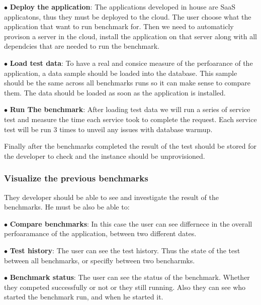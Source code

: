 $\bullet$ \textbf{Deploy the application}: The applications developed in house are SaaS
applicatons, thus they must be deployed to the cloud. The user
choose what the application that want to run benchmark for. Then we need to
automaticly provison a server in the cloud, install the application on that
server along with all dependcies that are needed to run the benchmark.

$\bullet$ \textbf{Load test data}: To have a real and consice measure of the perfoarance of the
application, a data sample should be loaded into the database. This sample should
be the same across all benchmarks runs so it can make sense to compare them. The
data should be loaded as soon as the application is installed.

$\bullet$ \textbf{Run The benchmark}: After loading test data we will run a series of service test
and measure the time each service took to complete the request. Each service
test will be run 3 times to unveil any issues with database warmup.

Finally after the benchmarks completed the result of the test should be stored
for the developer to check and the instance should be unprovisioned.

\subsubsection{Visualize the previous benchmarks}
They developer should be able to see and investigate the result of the
benchmarks. He must be also be able to:

$\bullet$ \textbf{Compare benchmarks}: In this case the user can see differnece
in the overall perfoaramance of the application, between two different dates.

$\bullet$ \textbf{Test history}: The user can see the test history. Thus the
state of the test between all benchmarks, or specifly between two bencharmks.

$\bullet$ \textbf{Benchmark status}: The user can see the status of the
benchmark. Whether they competed successfully or not or they still running. Also
they can see who started the benchmark run, and when he started it.

